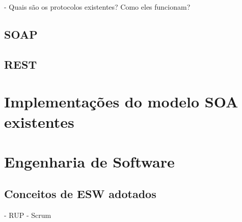 - Quais são os protocolos existentes? Como eles funcionam?

\subsection{SOAP}

\subsection{REST}

\section{Implementações do modelo SOA existentes}

\section{Engenharia de Software}

\subsection{Conceitos de ESW adotados}
- RUP
- Scrum